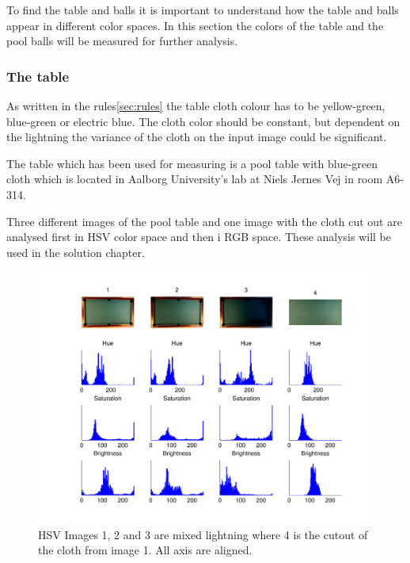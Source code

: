 To find the table and balls it is important to understand how the table and balls appear in different color spaces. In this section the colors of the table and the pool balls will be measured for further analysis.\\

\subsubsection{The table}
As written in the rules\ref{sec:rules} the table cloth colour has to be yellow-green, blue-green or electric blue. The cloth color should be constant, but dependent on the lightning the variance of the cloth on the input image could be significant.

The table which has been used for measuring is a pool table with blue-green cloth which is located in Aalborg University's lab at Niels Jernes Vej in room A6-314.

Three different images of the pool table and one image with the cloth cut out are analysed first in HSV color space and then i RGB space. These analysis will be used in the solution chapter.

\begin{figure}[H]
\begin{center}
\leavevmode
\includegraphics[width=1\textwidth]{images/hsv_hist_table}
\end{center}
\caption{HSV Images 1, 2 and 3 are mixed lightning where 4 is the cutout of the cloth from image 1. All axis are aligned.}
\label{fig:tablehsv}
\end{figure}

